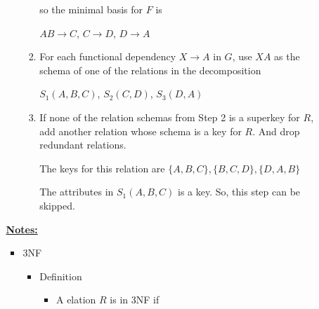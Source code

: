 \documentclass[12pt]{article}
\begin{document}
\begin{enumerate}[1.]
\begin{enumerate}[a)]
\begin{enumerate}[i)]
\begin{enumerate}[1.]
                \bigskip

                so the minimal basis for $F$ is

                \bigskip

                $AB \to C$, $C \to D$, $D \to A$
                \color{black}

                \bigskip

                \item For each functional dependency $X \to A$ in $G$, use $XA$
                as the schema of one of the relations in the decomposition

                \bigskip

                \color{red}
                $S_1(A,B,C)$, $S_2(C,D)$, $S_3(D,A)$
                \color{black}

                \bigskip

                \item If none of the relation schemas from Step 2 is a superkey for $R$,
                add another relation whose schema is a key for $R$. And drop redundant relations.

                \bigskip

                \color{red}
                The keys for this relation are $\{A,B,C\}, \{B,C,D\}, \{D,A,B\}$

                \bigskip

                The attributes in $S_1(A,B,C)$ is a key. So, this step can be skipped.
                \color{black}

            \end{enumerate}
        \end{enumerate}

        \bigskip

        \underline{\textbf{Notes:}}

        \bigskip

        \begin{itemize}
            \item 3NF
            \begin{itemize}
                \item Definition
                \begin{itemize}
                    \item A elation $R$ is in 3NF if

                    \bigskip


\end{itemize}
\end{itemize}
\end{itemize}
\end{enumerate}
\end{enumerate}
\end{document}
